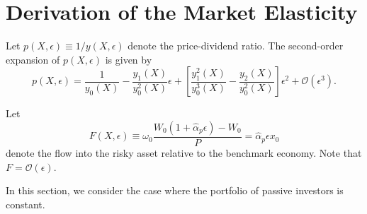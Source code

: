 

\section{Derivation of the Market Elasticity}

Let $p(X,\epsilon) \equiv 1/y(X,\epsilon)$ denote the price-dividend ratio.
The second-order expansion of $p(X,\epsilon)$ is given by
\begin{equation}\label{eq:price-dividend}
    p(X,\epsilon)
    =
    \frac{1}{y_0(X)}
    -
    \frac{y_1(X)}{y_0^2(X)} \epsilon
    +
    \left[
    \frac{y_1^2(X)}{y_0^3(X)}
    -
    \frac{y_{2}(X)}{y_0^2(X)}
    \right] \epsilon^2
    + \mathcal{O}(\epsilon^3).
\end{equation}

Let
\begin{equation}
    F(X,\epsilon)
    \equiv
    \omega_0 \frac{W_0 (1+\hat{\alpha}_p \epsilon) - W_0}{P}
    =
    \hat{\alpha}_p \epsilon x_0
\end{equation}
denote the flow into the risky asset relative to the benchmark economy.
Note that $F = \mathcal{O}(\epsilon)$.

In this section, we consider the case where the portfolio of passive investors is constant. 

